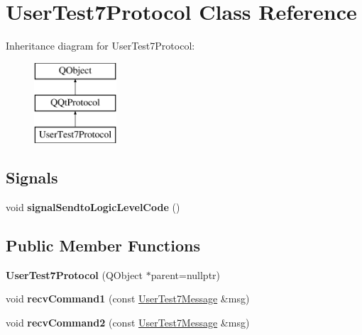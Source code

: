 \hypertarget{class_user_test7_protocol}{}\section{User\+Test7\+Protocol Class Reference}
\label{class_user_test7_protocol}
Inheritance diagram for User\+Test7\+Protocol\+:\begin{figure}[H]
\begin{center}
\leavevmode
\includegraphics[height=3.000000cm]{class_user_test7_protocol}
\end{center}
\end{figure}
\subsection*{Signals}
\begin{DoxyCompactItemize}
\item 
\mbox{\label{class_user_test7_protocol_a8c383338b85c1318bfcf6eba4c3e7013}} 
void {\bfseries signal\+Sendto\+Logic\+Level\+Code} ()
\end{DoxyCompactItemize}
\subsection*{Public Member Functions}
\begin{DoxyCompactItemize}
\item 
\mbox{\label{class_user_test7_protocol_a601fb250c08a81c061c1b888e2aae96b}} 
{\bfseries User\+Test7\+Protocol} (Q\+Object $\ast$parent=nullptr)
\item 
\mbox{\label{class_user_test7_protocol_adab005caf52f76f3d8019fbcc03b55b5}} 
void {\bfseries recv\+Command1} (const \mbox{\hyperlink{class_user_test7_message}{User\+Test7\+Message}} \&msg)
\item 
\mbox{\label{class_user_test7_protocol_a8d5714ccb203963fe2bc32d508c6bffd}} 
void {\bfseries recv\+Command2} (const \mbox{\hyperlink{class_user_test7_message}{User\+Test7\+Message}} \&msg)
\end{DoxyCompactItemize}
